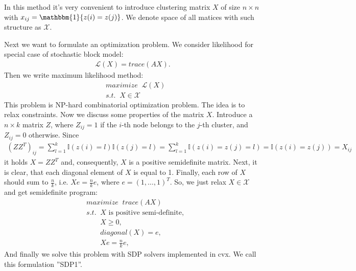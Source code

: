 
In this method it's very convenient to introduce clustering matrix $X$ of size $n\times n$ with $x_{ij} = \mathbbm{1}\{ z(i) = z(j) \}$.
We denote space of all matices with such structure as $\mathcal{X}$.

Next we want to formulate an optimization problem.
We consider likelihood for special case of stochastic block model:
\begin{equation}
    \begin{aligned}
        \mathcal{L}(X) = trace(AX).
    \nonumber
    \end{aligned}
\end{equation}
Then we write maximum likelihood method:
\begin{equation}
    \begin{aligned}
    &maximize\;\;\mathcal{L}(X)\\
    &s.t. \;\;X \in \mathcal{X}
    \nonumber
    \end{aligned}
\end{equation}
This problem is NP-hard combinatorial optimization problem. The idea is to relax constraints.
Now we discuss some properties of the matrix $X$.
Introduce a $n\times k$ matrix $Z$, where $Z_{ij} = 1$ if the $i$\/-th node belongs to the $j$\/-th cluster, and $Z_{ij} = 0$ otherwise.
Since
\begin{equation}
    \begin{aligned}
    \left( ZZ^T \right)_{ij} = \sum\limits_{l=1}^k \mathbb I\left(z(i) = l \right) \mathbb I\left(z(j) = l \right) = \sum\limits_{l=1}^k \mathbb I\left(z(i) = z(j) = l \right) = \mathbb I \left( z(i) = z(j) \right) = X_{ij}
    \nonumber
    \end{aligned}
\end{equation}
it holds $X = ZZ^T$ and, consequently, $X$ is a positive semidefinite matrix.
Next, it is clear, that each diagonal element of $X$ is equal to 1.
Finally, each row of $X$ should sum to $\frac nk$, i.e. $Xe = \frac{n}{k}e$, where $e = (1,\ldots,1)^T$.
So, we just relax $X \in \mathcal{X}$ and get semidefinite program:
\begin{equation}
    \begin{aligned}
    &maximize\;\;trace(AX)\\
    &s.t. \;\;X \text{ is positive semi-definite}, \\
    &\;\;\;\;\;\;\; X \geq 0, \\
    &\;\;\;\;\;\;\; diagonal(X) = e, \\
    &\;\;\;\;\;\;\; Xe = \frac{n}{k}e,
    \nonumber
    \end{aligned}
\end{equation}
And finally we solve this problem with SDP solvers implemented in cvx. We call this formulation ''SDP1''.

